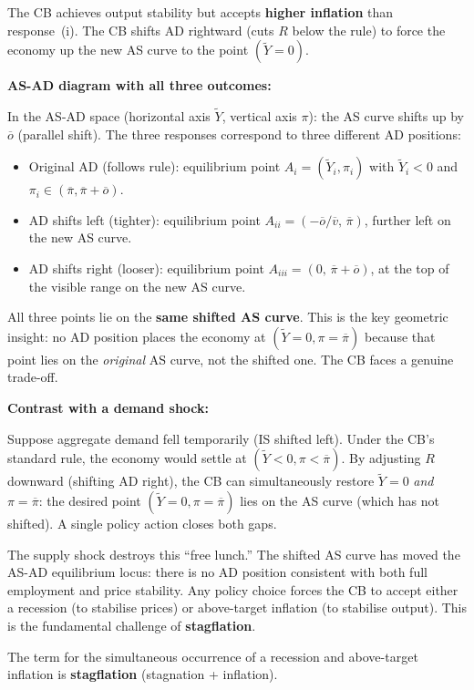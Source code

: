 \documentclass[letterpaper,12pt]{article}
\begin{document}
The CB achieves output stability but accepts \textbf{higher inflation} than response~(i). The CB shifts AD rightward (cuts $R$ below the rule) to force the economy up the new AS curve to the point $(\widetilde{Y} = 0)$.

\medskip
\noindent\textbf{AS-AD diagram with all three outcomes:}

In the AS-AD space (horizontal axis $\widetilde{Y}$, vertical axis $\pi$): the AS curve shifts up by $\overline{o}$ (parallel shift). The three responses correspond to three different AD positions:
\begin{itemize}
  \item[(i)] Original AD (follows rule): equilibrium point $A_i = (\widetilde{Y}_i, \pi_i)$ with $\widetilde{Y}_i < 0$ and $\pi_i \in (\overline{\pi}, \overline{\pi}+\overline{o})$.
  \item[(ii)] AD shifts left (tighter): equilibrium point $A_{ii} = (-\overline{o}/\overline{v},\, \overline{\pi})$, further left on the new AS curve.
  \item[(iii)] AD shifts right (looser): equilibrium point $A_{iii} = (0,\, \overline{\pi}+\overline{o})$, at the top of the visible range on the new AS curve.
\end{itemize}

All three points lie on the \textbf{same shifted AS curve}. This is the key geometric insight: no AD position places the economy at $(\widetilde{Y}=0, \pi=\overline{\pi})$ because that point lies on the \emph{original} AS curve, not the shifted one. The CB faces a genuine trade-off.

\medskip
\noindent\textbf{Contrast with a demand shock:}

Suppose aggregate demand fell temporarily (IS shifted left). Under the CB's standard rule, the economy would settle at $(\widetilde{Y} < 0, \pi < \overline{\pi})$. By adjusting $R$ downward (shifting AD right), the CB can simultaneously restore $\widetilde{Y} = 0$ \emph{and} $\pi = \overline{\pi}$: the desired point $(\widetilde{Y}=0, \pi=\overline{\pi})$ lies on the AS curve (which has not shifted). A single policy action closes both gaps.

The supply shock destroys this ``free lunch.'' The shifted AS curve has moved the AS-AD equilibrium locus: there is no AD position consistent with both full employment and price stability. Any policy choice forces the CB to accept either a recession (to stabilise prices) or above-target inflation (to stabilise output). This is the fundamental challenge of \textbf{stagflation}.

The term for the simultaneous occurrence of a recession and above-target inflation is \textbf{stagflation} (stagnation + inflation).
\end{document}
